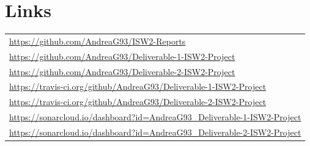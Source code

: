 \documentclass[sigconf]{acmart}
\begin{document}
\clearpage

\section{Links}

\begin{tabular}{l}

\url{https://github.com/AndreaG93/ISW2-Reports} \\

\url{https://github.com/AndreaG93/Deliverable-1-ISW2-Project} \\

\url{https://github.com/AndreaG93/Deliverable-2-ISW2-Project} \\

\url{https://travis-ci.org/github/AndreaG93/Deliverable-1-ISW2-Project} \\

\url{https://travis-ci.org/github/AndreaG93/Deliverable-2-ISW2-Project} \\

\url{https://sonarcloud.io/dashboard?id=AndreaG93_Deliverable-1-ISW2-Project} \\

\url{https://sonarcloud.io/dashboard?id=AndreaG93_Deliverable-2-ISW2-Project} \\

\end{tabular}



\end{document}
